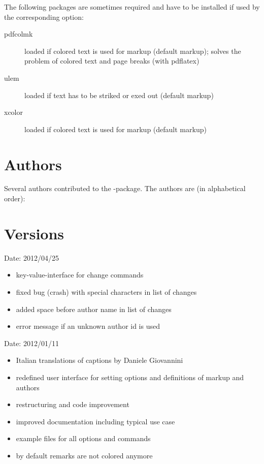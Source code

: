 The following packages are sometimes required and have to be installed if used by the corresponding option:
\begin{description}
	\item [pdfcolmk] loaded if colored text is used for markup (default markup); solves the problem of colored text and page breaks (with pdflatex)
	\item [ulem] loaded if text has to be striked or exed out (default markup)
	\item [xcolor] loaded if colored text is used for markup (default markup)
\end{description}


\section{Authors}
\label{sec:authors}

Several authors contributed to the -package.
The authors are (in alphabetical order):



\section{Versions}
\label{sec:versions}


Date: 2012/04/25
\begin{itemize}
	\item key-value-interface for change commands
	\item fixed bug (crash) with special characters in list of changes
	\item added space before author name in list of changes
	\item error message if an unknown author id is used
\end{itemize}


Date: 2012/01/11
\begin{itemize}
	\item Italian translations of captions by Daniele Giovannini
	\item redefined user interface for setting options and definitions of markup and authors
	\item restructuring and code improvement
	\item improved documentation including typical use case
	\item example files for all options and commands
	\item by default remarks are not colored anymore
\end{itemize}

